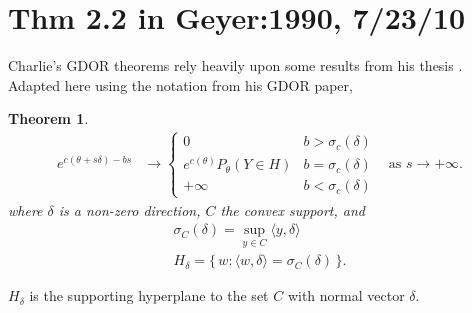 \documentclass{amsbook}
\newcommand{\set}[1]{\{\,#1\,\}}
\newcommand{\inner}[1]{\langle #1 \rangle}
\newtheorem{theorem}{Theorem}
\theoremstyle{definition}
\theoremstyle{remark}
\begin{document}
\section{Thm 2.2 in Geyer:1990, 7/23/10}
Charlie's GDOR theorems rely heavily upon some results from his thesis \citep{Geyer:1990}.  Adapted here 
using the notation from his GDOR paper,
\begin{theorem}
\begin{align*}
e^{c(\theta + s \delta) - bs} &\to 
		\begin{cases} 
			0 								& b > \sigma_c(\delta) \\
			e^{c(\theta)} P_\theta(Y \in H ) 	& b = \sigma_c(\delta) \\
			+\infty							& b < \sigma_c(\delta)
		\end{cases}
& \text{as } s \to +\infty.
\end{align*}
where $\delta$ is a non-zero direction, $C$ the convex support, and
\begin{align*}
	\sigma_C (\delta) = \sup_{y \in C} \inner{ y, \delta} \\
	H_\delta = \set{w: \inner{w, \delta} = \sigma_C(\delta) }.
\end{align*}
\end{theorem}
$H_\delta$ is the supporting hyperplane to the set $C$ with normal vector $\delta$.
\end{document}
